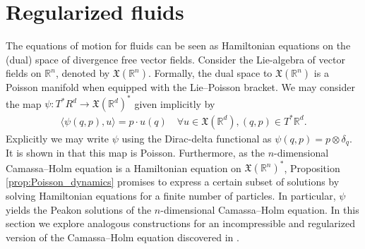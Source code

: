 \documentclass[12pt]{amsart}
\begin{document}
\section{Regularized fluids}
  The equations of motion for fluids can be seen as
  Hamiltonian equations on the (dual) space of divergence
  free vector fields.
  Consider the Lie-algebra of vector fields on $\mathbb{R}^n$, 
  denoted by $\mathfrak{X}(\mathbb{R}^n)$.
  Formally, the dual space to $\mathfrak{X}(\mathbb{R}^n)$ is a Poisson
  manifold when equipped with the Lie--Poisson bracket.
  We may consider the map
  $\psi: T^*R^d \to \mathfrak{X}(\mathbb{R}^d)^*$
  given implicitly by
  \begin{align*}
    \langle \psi(q,p) , u \rangle = p \cdot u(q) \quad
    \forall u \in \mathfrak{X}(\mathbb{R}^d), (q,p) \in T^*\mathbb{R}^d.
  \end{align*}
  Explicitly we may write $\psi$ using the Dirac-delta
  functional as $\psi(q,p) = p \otimes \delta_q$.
  It is shown in \cite{HolmMarsden2005} that this map is Poisson.
  Furthermore, as the $n$-dimensional Camassa--Holm equation is a
  Hamiltonian equation on $\mathfrak{X}(\mathbb{R}^n)^*$,
  Proposition \ref{prop:Poisson_dynamics} promises to express a 
  certain subset
  of solutions by solving Hamiltonian equations for a finite number
  of particles.
  In particular, $\psi$ yields the Peakon solutions of the $n$-dimensional
  Camassa--Holm equation.
  In this section we explore analogous constructions for
  an incompressible and regularized version of the
  Camassa--Holm equation discovered in \cite{MumfordMichor2013}.
\end{document}
